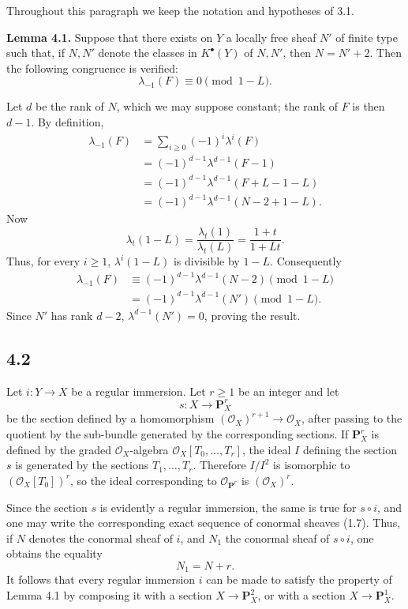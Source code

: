 Throughout this paragraph we keep the notation and hypotheses of 3.1.

\textbf{Lemma 4.1.} Suppose that there exists on \(Y\) a locally free sheaf \(N'\) of finite type such that, if \(N,N'\) denote the classes in \(K^\bullet(Y)\) of \(N,N'\), then \(N=N'+2\). Then the following congruence is verified:
\[
  \lambda_{-1}(F)\equiv 0 \pmod{1-L}.
\]

Let \(d\) be the rank of \(N\), which we may suppose constant; the rank of \(F\) is then \(d-1\). By definition,
\[
\begin{aligned}
\lambda_{-1}(F)
 &= \sum_{i\ge0}(-1)^i\lambda^i(F)\\
 &= (-1)^{d-1}\lambda^{d-1}(F-1)\\
 &= (-1)^{d-1}\lambda^{d-1}(F+L-1-L)\\
 &= (-1)^{d-1}\lambda^{d-1}(N-2+1-L).
\end{aligned}
\]
Now
\[
  \lambda_t(1-L)=\frac{\lambda_t(1)}{\lambda_t(L)}
  =\frac{1+t}{1+Lt}.
\]
Thus, for every \(i\ge1\), \(\lambda^i(1-L)\) is divisible by \(1-L\). Consequently
\[
\begin{aligned}
\lambda_{-1}(F)
  &\equiv (-1)^{d-1}\lambda^{d-1}(N-2) \pmod{1-L}\\
  &=(-1)^{d-1}\lambda^{d-1}(N') \pmod{1-L}.
\end{aligned}
\]
Since \(N'\) has rank \(d-2\), \(\lambda^{d-1}(N')=0\), proving the result.

\subsection*{4.2}

Let \(i:Y\to X\) be a regular immersion. Let \(r\ge1\) be an integer and let
\[
  s:X\longrightarrow \mathbf P_X^r
\]
be the section defined by a homomorphism \((\mathcal O_X)^{r+1}\to\mathcal O_X\), after passing to the quotient by the sub-bundle generated by the corresponding sections. If \(\mathbf P_X^r\) is defined by the graded \(\mathcal O_X\)-algebra \(\mathcal O_X[T_0,\ldots,T_r]\), the ideal \(I\) defining the section \(s\) is generated by the sections \(T_1,\ldots,T_r\). Therefore \(I/I^2\) is isomorphic to \((\mathcal O_X[T_0])^r\), so the ideal corresponding to \(\mathcal O_{\mathbf P^r}\) is \((\mathcal O_X)^r\).

Since the section \(s\) is evidently a regular immersion, the same is true for \(s\circ i\), and one may write the corresponding exact sequence of conormal sheaves (1.7). Thus, if \(N\) denotes the conormal sheaf of \(i\), and \(N_1\) the conormal sheaf of \(s\circ i\), one obtains the equality
\[
  N_1=N+r.
\]
It follows that every regular immersion \(i\) can be made to satisfy the property of Lemma 4.1 by composing it with a section \(X\to\mathbf P_X^2\), or with a section \(X\to\mathbf P_X^1\).

